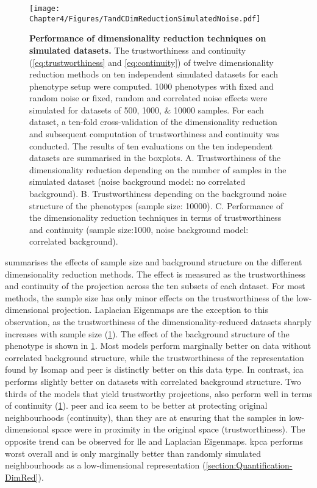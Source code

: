 \begin{figure}[hbtp]
	\centering
	\texttt{[image: Chapter4/Figures/TandCDimReductionSimulatedNoise.pdf]}
	\caption[\textbf{Performance of dimensionality reduction techniques on simulated datasets.}]{\textbf{Performance of dimensionality reduction techniques on simulated datasets.} The trustworthiness and continuity (\cref{eq:trustworthiness} and \cref{eq:continuity}) of twelve dimensionality reduction methods on ten independent simulated datasets for each phenotype setup were computed.  \num{1000} phenotypes with fixed and random noise or fixed, random and correlated noise effects were simulated for datasets of \numlist{500;1000; 10000} samples. For each dataset, a ten-fold cross-validation of the dimensionality reduction and subsequent computation of trustworthiness and continuity was conducted. The results of ten evaluations on the ten independent datasets are summarised in the boxplots. A. Trustworthiness of the dimensionality reduction depending on the number of samples in the simulated dataset (noise background model: no correlated background). B. Trustworthiness depending on the background noise structure of the phenotypes (sample size: \num{10000}). C. Performance of the dimensionality reduction techniques in terms of trustworthiness and continuity (sample size:\num{1000}, noise background model: correlated background).}
	 	\label{fig:TaC-noise}
\end{figure}


 summarises the effects of sample size and background structure on the different dimensionality reduction methods. The effect is measured as the trustworthiness and continuity of the projection across the ten subsets of each dataset. For most methods, the sample size has only minor effects on the trustworthiness of the low-dimensional projection. Laplacian Eigenmaps are the exception to this observation, as the trustworthiness of the dimensionality-reduced datasets sharply increases with sample size (\cref{fig:TaC-noise}). The effect of the background structure of the phenotype is shown in \cref{fig:TaC-noise}. Most models perform marginally better on data without correlated background structure, while the trustworthiness of the representation found by Isomap and \gls{peer} is distinctly better on this data type. In contrast, \gls{ica} performs slightly better on datasets with correlated background structure. Two thirds of the models that yield trustworthy projections, also perform well in terms of continuity (\cref{fig:TaC-noise}). \gls{peer} and \gls{ica} seem to be better at protecting original neighbourhoods (continuity), than they are at ensuring that the samples in low-dimensional space were in proximity in the original space (trustworthiness). The opposite trend can be observed for \gls{lle} and Laplacian Eigenmaps. \gls{kpca} performs worst overall and is only marginally better than randomly simulated neighbourhoods as a low-dimensional representation (\cref{section:Quantification-DimRed}).

